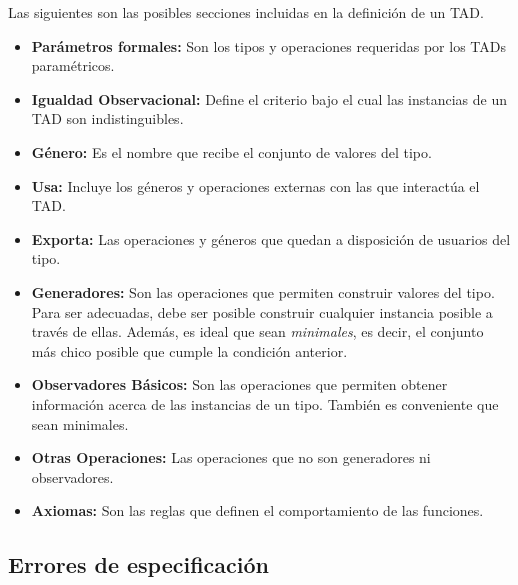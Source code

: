 \documentclass{article}
\begin{document}
Las siguientes son las posibles secciones incluidas en la definición de un TAD.
\begin{itemize}
    \item \textbf{Parámetros formales:} Son los tipos y operaciones requeridas por los TADs paramétricos.
    \item \textbf{Igualdad Observacional:} Define el criterio bajo el cual las instancias de un TAD son indistinguibles.
    \item \textbf{Género:} Es el nombre que recibe el conjunto de valores del tipo.
    \item \textbf{Usa:} Incluye los géneros y operaciones externas con las que interactúa el TAD.
    \item \textbf{Exporta:} Las operaciones y géneros que quedan a disposición de usuarios del tipo.
    \item \textbf{Generadores:} Son las operaciones que permiten construir valores del tipo. Para ser adecuadas, debe ser posible construir cualquier instancia posible a través de ellas. Además, es ideal que sean \textit{minimales}, es decir, el conjunto más chico posible que cumple la condición anterior.
    \item \textbf{Observadores Básicos:} Son las operaciones que permiten obtener información acerca de las instancias de un tipo. También es conveniente que sean minimales.
    \item \textbf{Otras Operaciones:} Las operaciones que no son generadores ni observadores.
    \item \textbf{Axiomas:} Son las reglas que definen el comportamiento de las funciones.
\end{itemize}

\subsection{Errores de especificación}
\end{document}
